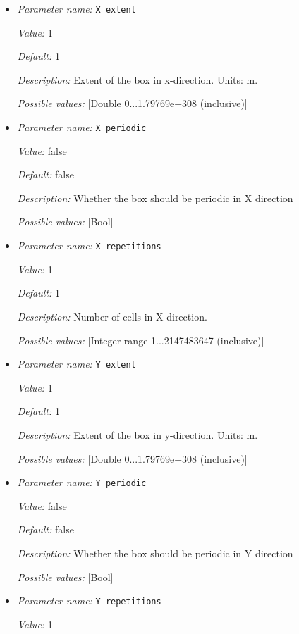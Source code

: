 \begin{itemize}
\item {\it Parameter name:} {\tt X extent}


{\it Value:} 1


{\it Default:} 1


{\it Description:} Extent of the box in x-direction. Units: m.


{\it Possible values:} [Double 0...1.79769e+308 (inclusive)]
\item {\it Parameter name:} {\tt X periodic}


{\it Value:} false


{\it Default:} false


{\it Description:} Whether the box should be periodic in X direction


{\it Possible values:} [Bool]
\item {\it Parameter name:} {\tt X repetitions}


{\it Value:} 1


{\it Default:} 1


{\it Description:} Number of cells in X direction.


{\it Possible values:} [Integer range 1...2147483647 (inclusive)]
\item {\it Parameter name:} {\tt Y extent}


{\it Value:} 1


{\it Default:} 1


{\it Description:} Extent of the box in y-direction. Units: m.


{\it Possible values:} [Double 0...1.79769e+308 (inclusive)]
\item {\it Parameter name:} {\tt Y periodic}


{\it Value:} false


{\it Default:} false


{\it Description:} Whether the box should be periodic in Y direction


{\it Possible values:} [Bool]
\item {\it Parameter name:} {\tt Y repetitions}


{\it Value:} 1



\end{itemize}
